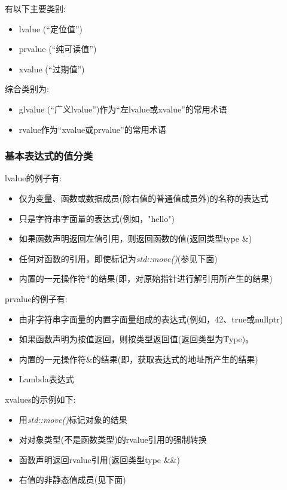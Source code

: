 有以下主要类别:

\begin{itemize}
	\item lvalue (“定位值”)
	\item prvalue (“纯可读值”)
	\item xvalue (“过期值”)
\end{itemize}

综合类别为:

\begin{itemize}
	\item glvalue (“广义lvalue”)作为“左lvalue或xvalue”的常用术语
	\item rvalue作为“xvalue或prvalue”的常用术语
\end{itemize}

\subsubsection{基本表达式的值分类}

lvalue的例子有:

\begin{itemize}
	\item 仅为变量、函数或数据成员(除右值的普通值成员外)的名称的表达式
	\item 只是字符串字面量的表达式(例如，"hello")
	\item 如果函数声明返回左值引用，则返回函数的值(返回类型type \&)
	\item 任何对函数的引用，即使标记为\textit{std::move()}(参见下面)
	\item 内置的一元操作符*的结果(即，对原始指针进行解引用所产生的结果)
\end{itemize}

prvalue的例子有:

\begin{itemize}
	\item 由非字符串字面量的内置字面量组成的表达式(例如，42、true或nullptr)
	\item 如果函数声明为按值返回，则按类型返回值(返回类型为Type)。
	\item 内置的一元操作符\&的结果(即，获取表达式的地址所产生的结果)
	\item Lambda表达式
\end{itemize}

xvalues的示例如下:

\begin{itemize}
	\item 用\textit{std::move()}标记对象的结果
	\item 对对象类型(不是函数类型)的rvalue引用的强制转换
	\item 函数声明返回rvalue引用(返回类型type \&\&)
	\item 右值的非静态值成员(见下面)
\end{itemize}

